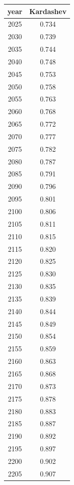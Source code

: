 \documentclass[a4paper]{article}
\begin{document}
	\noindent
	\begin{tabular}{|c|c|}
		\hline
		year & Kardashev \\
		\hline
		2025 & 0.734 \\
		\hline
		2030 & 0.739 \\
		\hline
		2035 & 0.744 \\
		\hline
		2040 & 0.748 \\
		\hline
		2045 & 0.753 \\
		\hline
		2050 & 0.758 \\
		\hline
		2055 & 0.763 \\
		\hline
		2060 & 0.768 \\
		\hline
		2065 & 0.772 \\
		\hline
		2070 & 0.777 \\
		\hline
		2075 & 0.782 \\
		\hline
		2080 & 0.787 \\
		\hline
		2085 & 0.791 \\
		\hline
		2090 & 0.796 \\
		\hline
		2095 & 0.801 \\
		\hline
		2100 & 0.806 \\
		\hline
		2105 & 0.811 \\
		\hline
		2110 & 0.815 \\
		\hline
		2115 & 0.820 \\
		\hline
		2120 & 0.825 \\
		\hline
		2125 & 0.830 \\
		\hline
		2130 & 0.835 \\
		\hline
		2135 & 0.839 \\
		\hline
		2140 & 0.844 \\
		\hline
		2145 & 0.849 \\
		\hline
		2150 & 0.854 \\
		\hline
		2155 & 0.859 \\
		\hline
		2160 & 0.863 \\
		\hline
		2165 & 0.868 \\
		\hline
		2170 & 0.873 \\
		\hline
		2175 & 0.878 \\
		\hline
		2180 & 0.883 \\
		\hline
		2185 & 0.887 \\
		\hline
		2190 & 0.892 \\
		\hline
		2195 & 0.897 \\
		\hline
		2200 & 0.902 \\
		\hline
		2205 & 0.907 \\

\end{tabular}
\end{document}
